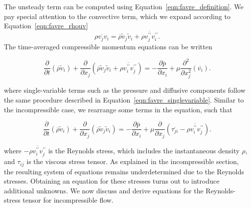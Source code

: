 The unsteady term can be computed using Equation~\ref{eqn:favre_definition}. We pay special attention to the convective term, which we expand according to Equation~\ref{eqn:favre_rhouv}
\begin{equation}
    \overline{\rho v_j v_i} = \overline{\rho}\tilde v_j\tilde v_i + \overline{\rho v_j^{\prime\prime} v_i^{\prime\prime}}.
\end{equation}
The time-averaged compressible momentum equations can be written
\begin{eqBox}
\begin{equation}
    \frac{\partial }{\partial t} \left(\overline\rho \tilde v_i \right)
    + \frac{\partial}{\partial x_j} \left(\overline\rho \tilde v_j \tilde v_i + \overline{\rho v_i^{\prime\prime}v_j^{\prime\prime}} \right)
    = - \frac{\partial \overline{p}}{\partial x_i} 
    + \mu \frac{\partial^2 }{\partial x_j^2} \left(\overline{v_i}\right).
\end{equation}
\end{eqBox}
where single-variable terms such as the pressure and diffusive components follow the same procedure described in Equation~\ref{eqn:favre_singlevariable}. Similar to the incompressible case, we rearrange some terms in the equation, such that
\begin{eqBox}
    \begin{equation}
        \frac{\partial }{\partial t} \left(\overline\rho \tilde v_i \right)
        + \frac{\partial}{\partial x_j} \left(\overline\rho \tilde v_j \tilde v_i \right)
        = - \frac{\partial \overline{p}}{\partial x_i} 
        + \mu \frac{\partial }{\partial x_j} \left(\overline{\tau_{ji}} - \overline{\rho v_i^{\prime\prime}v_j^{\prime\prime}}\right).
    \end{equation}
\end{eqBox}
where $-\overline{\rho v_i^{\prime\prime}v_j^{\prime\prime}}$ is the Reynolds stress, which includes the instantaneous density $\rho$, and $\tau_{ij}$ is the viscous stress tensor. As explained in the incompressible section, the resulting system of equations remains underdetermined due to the Reynolds stresses. Obtaining an equation for these stresses turns out to introduce additional unknowns. We now discuss and derive equations for the Reynolds-stress tensor for incompressible flow.

